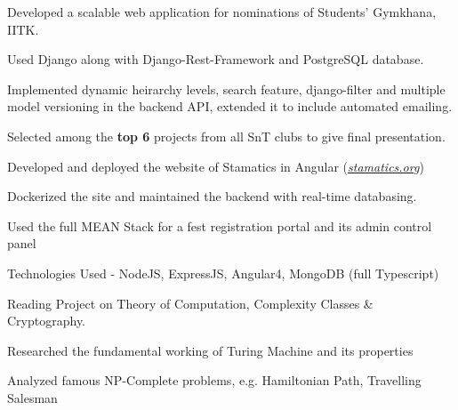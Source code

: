 \documentclass[]{deedy-resume-openfont}
\begin{document}
\begin{minipage}[t]{0.70\textwidth}
\vspace{0.1cm}
\vspace{0cm} %
\begin{tightemize}
  \item Developed a scalable web application for nominations of Students' Gymkhana, IITK.
  \item Used Django along with Django-Rest-Framework and PostgreSQL database.
  \item	Implemented dynamic heirarchy levels, search feature, django-filter and multiple model versioning in the backend API, extended it to include automated emailing.
  \item	Selected among the \textbf{top 6} projects from all SnT clubs to give final presentation.
\end{tightemize}

\vspace{0.1cm}
\begin{tightemize}
  \item Developed and deployed the website of Stamatics in Angular (\href{http://stamatics.org}{\textit{stamatics.org}})
  \item Dockerized the site and maintained the backend with real-time databasing.
\end{tightemize}
\begin{tightemize}
  \item Used the full MEAN Stack for a fest registration portal and its admin control panel
  \item Technologies Used - NodeJS, ExpressJS, Angular4, MongoDB (full Typescript)
\end{tightemize}

\vspace{0.1cm}
\begin{tightemize}
  \item Reading Project on Theory of Computation, Complexity Classes \& Cryptography.
  \item Researched the fundamental working of Turing Machine and its properties
  \item Analyzed famous NP-Complete problems, e.g. Hamiltonian Path, Travelling Salesman
\end{tightemize}



\end{minipage}
\end{document}
